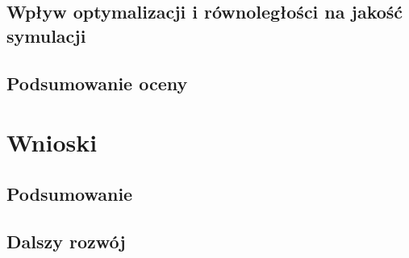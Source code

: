 \documentclass[pdflatex,11pt]{aghdpl}
\begin{document}
	\section{Wpływ optymalizacji i równoległości na jakość symulacji}
	\section{Podsumowanie oceny}
	
\chapter{Wnioski}
	\section{Podsumowanie}
	\section{Dalszy rozwój}

%
%


% 
% 



%
%
%
%
\end{document}
